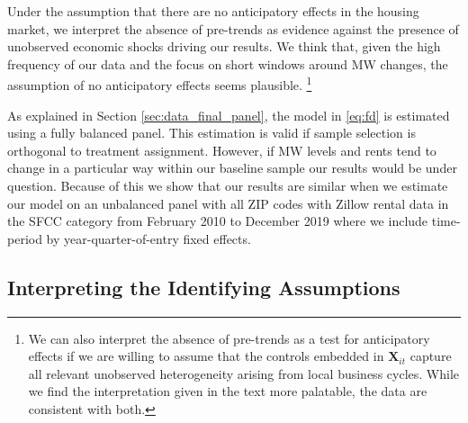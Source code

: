 Under the assumption that there are no anticipatory effects in the housing 
market, we interpret the absence of pre-trends as evidence against the presence 
of unobserved economic shocks driving our results.
We think that, given the high frequency of our data and the focus on short 
windows around MW changes, the assumption of no anticipatory effects seems 
plausible.%
\footnote{We can also interpret the absence of pre-trends as a test for 
anticipatory effects if we are willing to assume that the controls embedded in 
$\mathbf{X}_{it}$ capture all relevant unobserved heterogeneity arising from 
local business cycles.
While we find the interpretation given in the text more palatable, the data are 
consistent with both.}


As explained in Section \ref{sec:data_final_panel}, 
the model in \eqref{eq:fd} is estimated using a fully balanced panel.
This estimation is valid if sample selection is orthogonal to treatment 
assignment. However, if MW levels and rents tend to change in a particular way 
within our baseline sample our results would be under question.
Because of this we show that our results are similar when we estimate our model
on an unbalanced panel with all ZIP codes with Zillow rental data in the SFCC category 
from February 2010 to December 2019 where we include time-period by 
year-quarter-of-entry fixed effects.

\subsection{Interpreting the Identifying Assumptions}

